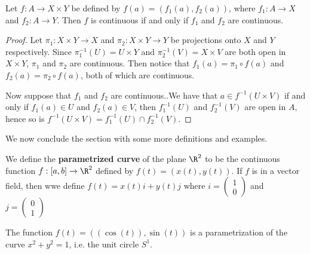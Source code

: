 \begin{theorem}\label{1.7.5}
    Let $f:A \rightarrow X \times Y$ be defined by  $f(a)=(f_1(a),f_2(a))$, where $ f_1:A
    \rightarrow X$ and $ f_2: A \rightarrow Y$. Then $f$ is continuous if and only if  $ f_1$ and $
    f_2$ are continuous.
\end{theorem}
\begin{proof}
    Let $\pi_1:X \times Y \rightarrow X$ and $\pi_2:X \times Y \rightarrow Y$ be projections onto
    $X$ and  $Y$ respectively. Since  $\pi_1^{-1}(U)=U \times Y$ and $\pi_2^{-1}(V)=X \times V$ are
    both open in  $X \times Y$,  $\pi_1$ and $\pi_2$ are continuous. Then notice that $ f_1(a)=\pi_1
    \circ f(a)$ and $ f_2(a)=\pi_2 \circ f(a)$, both of which are continuous.

    Now suppose that $ f_1$ and $ f_2$ are continuous..We have that $a \in f^{-1}(U \times V)$ if
    and only if $f_1(a) \in U$ and $ f_2(a) \in V$, then $ f_1^{-1}(U)$ and $f_2^{-1}(V)$ are open
    in $A$, hence so is $f^{-1}(U \times V)=f_1^{-1}(U) \cap f_2^{-1}(V)$.
\end{proof}

We now conclude the section with some more definitions and examples.

\begin{definition}
    We define the \textbf{parametrized curve} of the plane $\R^2$ to be the continuous function
    $f:[a,b] \rightarrow \R^2$ defined by $f(t)=(x(t),y(t))$. If $f$ is in a vector field, then wwe
    define $f(t)=x(t)i+y(t)j$ where $i=
    \begin{pmatrix}
        1 \\
        0
    \end{pmatrix}$
    and $j=
    \begin{pmatrix}
        0 \\
        1
    \end{pmatrix}$
\end{definition}

\begin{example}
    The function $f(t)=((\cos(t)),\sin(t))$ is a parametrization of the curve $x^2+y^2=1$, i.e. the
    unit circle  $S^1$.
\end{example}

